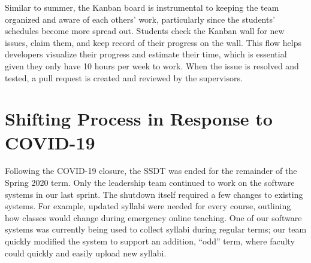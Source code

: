 Similar to summer, the Kanban board is instrumental to keeping the team organized and aware of each others' work, particularly since the students' schedules become more spread out. Students check the Kanban wall for new issues, claim them, and keep record of their progress on the wall. This flow helps developers visualize their progress and estimate their time, which is essential given they only have 10 hours per week to work. When the issue is resolved and tested, a pull request is created and reviewed by the supervisors.


\section{Shifting Process in Response to COVID-19}

Following the COVID-19 closure, the SSDT was ended for the remainder of the Spring 2020 term. Only the leadership team continued to work on the software systems in our last sprint. The shutdown itself required a few changes to existing systems. For example, updated syllabi were needed for every course, outlining how classes would change during emergency online teaching. One of our software systems was currently being used to collect syllabi during regular terms; our team quickly modified the system to support an addition, ``odd'' term, where faculty could quickly and easily upload new syllabi.


